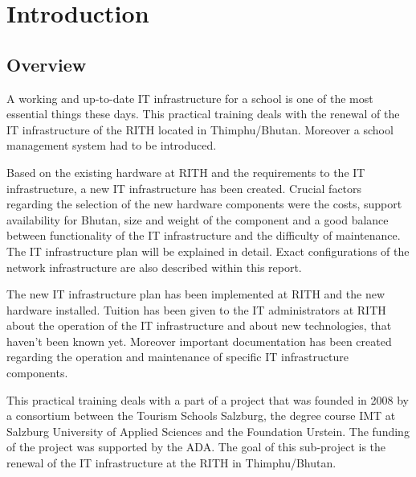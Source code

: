 \chapter{Introduction}

\thispagestyle{standard}
\pagestyle{standard}

\section{Overview}

A working and up-to-date IT infrastructure for a school is one of the most essential things these days. This practical training deals with the renewal of the IT infrastructure of the \ac{RITH} located in Thimphu/Bhutan. Moreover a school management system had to be introduced.

Based on the existing hardware at \ac{RITH} and the requirements to the IT infrastructure, a new IT infrastructure has been created. Crucial factors regarding the selection of the new hardware components were the costs, support availability for Bhutan, size and weight of the component and a good balance between functionality of the IT infrastructure and the difficulty of maintenance. The IT infrastructure plan will be explained in detail. Exact configurations of the network infrastructure are also described within this report.

The new IT infrastructure plan has been implemented at \ac{RITH} and the new hardware installed. Tuition has been given to the IT administrators at \ac{RITH} about the operation of the IT infrastructure and about new technologies, that haven't been known yet. Moreover important documentation has been created regarding the operation and maintenance of specific IT infrastructure components.

This practical training deals with a part of a project that was founded in 2008 by a consortium between the Tourism Schools Salzburg, the degree course IMT at Salzburg University of Applied Sciences and the Foundation Urstein. The funding of the project was supported by the \ac{ADA}. The goal of this sub-project is the renewal of the IT infrastructure at the \ac{RITH} in Thimphu/Bhutan.
